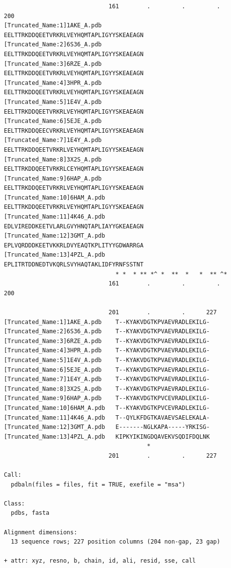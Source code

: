 \documentclass[
  letterpaper,
  DIV=11,
  numbers=noendperiod]{scrartcl}
\begin{document}
\begin{verbatim}
                              161        .         .         .         200 
[Truncated_Name:1]1AKE_A.pdb    EELTTRKDDQEETVRKRLVEYHQMTAPLIGYYSKEAEAGN
[Truncated_Name:2]6S36_A.pdb    EELTTRKDDQEETVRKRLVEYHQMTAPLIGYYSKEAEAGN
[Truncated_Name:3]6RZE_A.pdb    EELTTRKDDQEETVRKRLVEYHQMTAPLIGYYSKEAEAGN
[Truncated_Name:4]3HPR_A.pdb    EELTTRKDDQEETVRKRLVEYHQMTAPLIGYYSKEAEAGN
[Truncated_Name:5]1E4V_A.pdb    EELTTRKDDQEETVRKRLVEYHQMTAPLIGYYSKEAEAGN
[Truncated_Name:6]5EJE_A.pdb    EELTTRKDDQEECVRKRLVEYHQMTAPLIGYYSKEAEAGN
[Truncated_Name:7]1E4Y_A.pdb    EELTTRKDDQEETVRKRLVEYHQMTAPLIGYYSKEAEAGN
[Truncated_Name:8]3X2S_A.pdb    EELTTRKDDQEETVRKRLCEYHQMTAPLIGYYSKEAEAGN
[Truncated_Name:9]6HAP_A.pdb    EELTTRKDDQEETVRKRLVEYHQMTAPLIGYYSKEAEAGN
[Truncated_Name:10]6HAM_A.pdb   EELTTRKDDQEETVRKRLVEYHQMTAPLIGYYSKEAEAGN
[Truncated_Name:11]4K46_A.pdb   EDLVIREDDKEETVLARLGVYHNQTAPLIAYYGKEAEAGN
[Truncated_Name:12]3GMT_A.pdb   EPLVQRDDDKEETVKKRLDVYEAQTKPLITYYGDWARRGA
[Truncated_Name:13]4PZL_A.pdb   EPLITRTDDNEDTVKQRLSVYHAQTAKLIDFYRNFSSTNT
                                * *  * ** *^ *  **  *   *  ** ^*         
                              161        .         .         .         200 

                              201        .         .      227 
[Truncated_Name:1]1AKE_A.pdb    T--KYAKVDGTKPVAEVRADLEKILG-
[Truncated_Name:2]6S36_A.pdb    T--KYAKVDGTKPVAEVRADLEKILG-
[Truncated_Name:3]6RZE_A.pdb    T--KYAKVDGTKPVAEVRADLEKILG-
[Truncated_Name:4]3HPR_A.pdb    T--KYAKVDGTKPVAEVRADLEKILG-
[Truncated_Name:5]1E4V_A.pdb    T--KYAKVDGTKPVAEVRADLEKILG-
[Truncated_Name:6]5EJE_A.pdb    T--KYAKVDGTKPVAEVRADLEKILG-
[Truncated_Name:7]1E4Y_A.pdb    T--KYAKVDGTKPVAEVRADLEKILG-
[Truncated_Name:8]3X2S_A.pdb    T--KYAKVDGTKPVAEVRADLEKILG-
[Truncated_Name:9]6HAP_A.pdb    T--KYAKVDGTKPVCEVRADLEKILG-
[Truncated_Name:10]6HAM_A.pdb   T--KYAKVDGTKPVCEVRADLEKILG-
[Truncated_Name:11]4K46_A.pdb   T--QYLKFDGTKAVAEVSAELEKALA-
[Truncated_Name:12]3GMT_A.pdb   E-------NGLKAPA-----YRKISG-
[Truncated_Name:13]4PZL_A.pdb   KIPKYIKINGDQAVEKVSQDIFDQLNK
                                         *                  
                              201        .         .      227 

Call:
  pdbaln(files = files, fit = TRUE, exefile = "msa")

Class:
  pdbs, fasta

Alignment dimensions:
  13 sequence rows; 227 position columns (204 non-gap, 23 gap) 

+ attr: xyz, resno, b, chain, id, ali, resid, sse, call
\end{verbatim}
\end{document}
